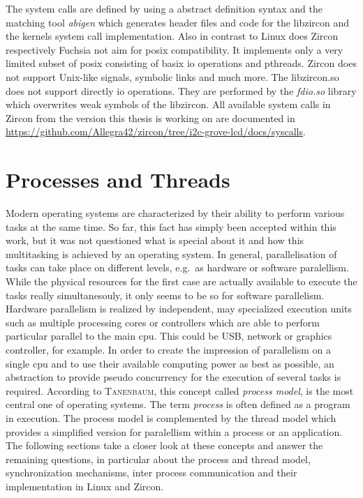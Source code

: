 The system calls are defined by using a abstract definition syntax and the matching tool \textit{abigen} which generates header files and code for the libzircon and the kernels system call implementation\cite{zircon-concepts}.
Also in contrast to Linux does Zircon respectively Fuchsia not aim for \ac{posix} compatibility.
It implements only a very limited subset of \ac{posix} consisting of basix \ac{io} operations and pthreads.
Zircon does not support Unix-like signals, symbolic links and much more\cite{zircon-libc-posix}.
The libzircon.so does not support directly \ac{io} operations. 
They are performed by the \textit{fdio.so} library which overwrites weak symbols of the libzircon\cite{zircon-libc-posix}.
All available system calls in Zircon from the version this thesis is working on are documented in \url{https://github.com/Allegra42/zircon/tree/i2c-grove-lcd/docs/syscalls}. 

\section{Processes and Threads}\label{sec:processes-threads}

Modern operating systems are characterized by their ability to perform various tasks at the same time.
So far, this fact has simply been accepted within this work, but it was not questioned what is special about it and how this multitasking is achieved by an operating system.
In general, parallelisation of tasks can take place on different levels, e.g.\ as hardware or software paralellism.
While the physical resources for the first case are actually available to execute the tasks really simultanesouly, it only seems to be so for software parallelism\cite{glatz2015betriebssysteme}.
Hardware parallelism is realized by independent, may specialized execution units such as multiple processing cores or controllers which are able to perform particular parallel to the main \ac{cpu}.
This could be USB, network or graphics controller, for example\cite{glatz2015betriebssysteme}.
In order to create the impression of parallelism on a single \ac{cpu} and to use their available computing power as best as possible, an abstraction to provide pseudo concurrency for the execution of several tasks is required.
According to \textsc{Tanenbaum}, this concept called \textit{process model}, is the most central one of operating systems\cite{tanenbaum-modern-operating-systems}.
The term \textit{process} is often defined as a program in execution\cite{achilles2006betriebssysteme}.
The process model is complemented by the thread model which provides a simplified version for paralellism within a process or an application\cite{glatz2015betriebssysteme}.
The following sections take a closer look at these concepts and answer the remaining questions, in particular about the process and thread model, synchronization mechanisms, inter process communication and their implementation in Linux and Zircon.


